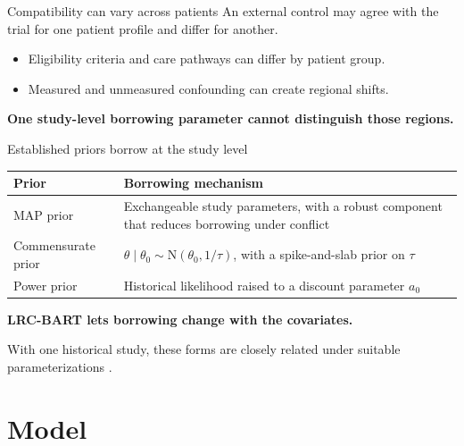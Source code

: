 \documentclass[11pt,aspectratio=169]{beamer}
\newcommand{\Normal}{\mathrm{N}}
\newcommand{\key}[1]{{\color{AccentBlue}\textbf{#1}}}
\newcommand{\sectionframe}[1]{%
  \begin{frame}[plain]
    \vspace*{0.46\paperheight}
    \hspace*{0.65cm}{\LARGE\bfseries #1}
  \end{frame}}
\begin{document}
\begin{frame}{Compatibility can vary across patients}
  \large
  An external control may agree with the trial for one patient profile and differ for another.

  \vspace{1.0em}
  \begin{itemize}\setlength\itemsep{0.8em}
    \item Eligibility criteria and care pathways can differ by patient group.
    \item Measured and unmeasured confounding can create regional shifts.
  \end{itemize}

  \vspace{0.9em}
  \centering
  \key{One study-level borrowing parameter cannot distinguish those regions.}
\end{frame}

\begin{frame}{Established priors borrow at the study level}
  \small
  \renewcommand{\arraystretch}{1.35}
  \begin{tabular}{p{}p{}}
    \toprule
    \textbf{Prior} & \textbf{Borrowing mechanism} \\
    \midrule
    MAP prior &
    Exchangeable study parameters, with a robust component that reduces borrowing under conflict
    \citep{Neuenschwander2010MAP,schmidli2014robust} \\
    Commensurate prior &
    $\theta\mid\theta_0\sim\Normal(\theta_0,1/\tau)$, with a spike-and-slab prior on $\tau$
    \citep{Hobbs2011,Hobbs2012} \\
    Power prior &
    Historical likelihood raised to a discount parameter $a_0$
    \citep{IbrahimChen2000} \\
    \bottomrule
  \end{tabular}

  \vspace{0.9em}
  \centering
  \key{LRC-BART lets borrowing change with the covariates.}

  \vfill
  {\scriptsize With one historical study, these forms are closely related under suitable parameterizations \citep{RoverFriede2025}.}
\end{frame}

\section{Model}
\sectionframe{A local discrepancy model}
\end{document}
